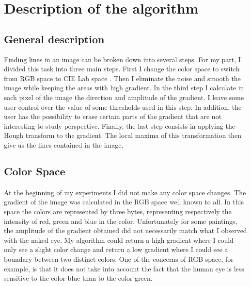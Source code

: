 \documentclass[10pt]{article}
\begin{document}
	\section{Description of the algorithm}
	

	\subsection{General description}
	
	Finding lines in an image can be broken down into several steps. For my part, I divided this task into three main steps. First I change the color space to switch from RGB space to CIE Lab space \cite{cielab}. Then I eliminate the noise and smooth the image while keeping the areas with high gradient. In the third step I calculate in each pixel of the image the direction and amplitude of the gradient. I leave some user control over the value of some thresholds used in this step. In addition, the user has the possibility to erase certain parts of the gradient that are not interesting to study perspective. Finally, the last step consists in applying the Hough transform to the gradient. The local maxima of this transformation then give us the lines contained in the image.	
	
	\subsection{Color Space}
	
	\paragraph{}
	At the beginning of my experiments I did not make any color space changes. The gradient of the image was calculated in the RGB space well known to all. In this space the colors are represented by three bytes, representing respectively the intensity of red, green and blue in the color. Unfortunately for some paintings, the amplitude of the gradient obtained did not necessarily match what I observed with the naked eye. My algorithm could return a high gradient where I could only see a slight color change and return a low gradient where I could see a boundary between two distinct colors. One of the concerns of RGB space, for example, is that it does not take into account the fact that the human eye is less sensitive to the color blue than to the color green.
	
\end{document}
